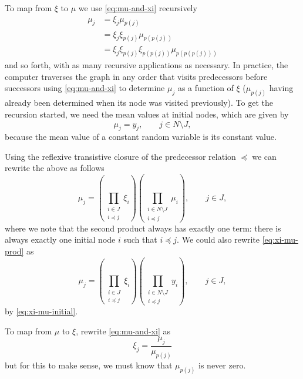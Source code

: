 To map from $\xi$ to $\mu$ we use \eqref{eq:mu-and-xi} recursively
\begin{align*}
   \mu_j
   & =
   \xi_j \mu_{p(j)}
   \\
   & =
   \xi_j \xi_{p(j)} \mu_{p(p(j))}
   \\
   & =
   \xi_j \xi_{p(j)} \xi_{p(p(j))} \mu_{p(p(p(j)))}
\end{align*}
and so forth, with as many recursive applications as necessary.  In practice,
the computer traverses the graph in any order that visits predecessors before
successors using \eqref{eq:mu-and-xi} to determine $\mu_j$ as a function of
$\xi$ ($\mu_{p(j)}$ having already been determined when its node was visited
previously).  To get the recursion started, we need the mean values at initial
nodes, which are given by
\begin{equation} \label{eq:xi-mu-initial}
   \mu_j = y_j, \qquad j \in N \setminus J,
\end{equation}
because the mean value of a constant random variable is its constant value.

Using the reflexive transistive closure of the predecessor relation $\preceq$
we can rewrite the above as follows
\begin{equation} \label{eq:xi-mu-prod}
    \mu_j
    =
    \left( \prod_{\substack{i \in J \\ i \preceq j}} \xi_i \right)
    \left( \prod_{\substack{i \in N \setminus J \\ i \preceq j}} \mu_i \right),
    \qquad j \in J,
\end{equation}
where we note that the second product always has exactly one term: there
is always exactly one initial node $i$ such that $i \preceq j$.
We could also rewrite \eqref{eq:xi-mu-prod} as
\begin{equation} \label{eq:xi-mu-prod-too}
    \mu_j
    =
    \left( \prod_{\substack{i \in J \\ i \preceq j}} \xi_i \right)
    \left( \prod_{\substack{i \in N \setminus J \\ i \preceq j}} y_i \right),
    \qquad j \in J,
\end{equation}
by \eqref{eq:xi-mu-initial}.

To map from $\mu$ to $\xi$, rewrite \eqref{eq:mu-and-xi} as
\begin{equation} \label{eq:mu-to-xi}
   \xi_j = \frac{\mu_j}{\mu_{p(j)}}
\end{equation}
but for this to make sense, we must know that $\mu_{p(j)}$ is never zero.

